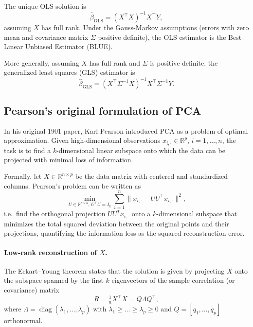The unique OLS solution is
\[
\hat{\beta}_{\text{OLS}} = (X^\top X)^{-1} X^\top Y,
\]
assuming \(X\) has full rank. Under the Gauss-Markov assumptions (errors with zero mean and covariance matrix \(\Sigma\) positive definite), the OLS estimator is the Best Linear Unbiased Estimator (BLUE).  

More generally, assuming \(X\) has full rank and \(\Sigma\) is positive definite, the generalized least squares (GLS) estimator is
\[
\hat{\beta}_{\text{GLS}} = (X^\top \Sigma^{-1} X)^{-1} X^\top \Sigma^{-1} Y.
\]



\subsection{Pearson's original formulation of PCA}

In his original 1901 paper, Karl Pearson introduced PCA as a problem of optimal approximation. Given high-dimensional observations $x_{i,\cdot} \in \mathbb{R}^p$, $i=1,\dots,n$, the task is to find a $k$-dimensional linear subspace onto which the data can be projected with minimal loss of information.

Formally, let $X \in \mathbb{R}^{n \times p}$ be the data matrix with centered and standardized columns. Pearson’s problem can be written as
\[
\min_{U \in \mathbb{R}^{p \times k}, \, U^\top U = I_k} 
\sum_{i=1}^n \| x_{i,\cdot} - U U^\top x_{i,\cdot} \|^2,
\]
i.e.\ find the orthogonal projection $UU^Tx_{i,\cdot}$ onto a $k$-dimensional subspace that minimizes the total squared deviation between the original points and their projections, quantifying the information loss as the squared reconstruction error.

\paragraph{Low-rank reconstruction of $X$.} 

The Eckart–Young theorem states that the solution is given by projecting $X$ onto the subspace spanned by the first $k$ eigenvectors of the sample correlation (or covariance) matrix
\[
R = \tfrac{1}{n} X^\top X = Q \Lambda Q^\top,
\]
where $\Lambda = \operatorname{diag}(\lambda_1, \dots, \lambda_p)$ with $\lambda_1 \ge \dots \ge \lambda_p \ge 0$ 
and $Q = [q_1,\dots,q_p]$ orthonormal.

